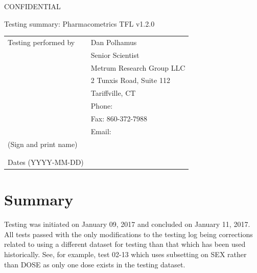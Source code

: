 \documentclass{article}
\newcommand{\topic}{Testing summary: Pharmacometrics TFL v1.2.0}
\begin{document}
\vspace*{1cm}
\begin{center}
{\large CONFIDENTIAL}


\vspace*{1cm}


\vspace*{1cm}

{\Large \topic}
\vspace{3.0cm}
\end{center}

\newpage
\vspace*{1cm}
\begin{center}
\vspace{3.0cm}

\begin{tabular}{|l|l|}\hline
Testing performed by &   Dan Polhamus\\
                      &  Senior Scientist \\
                      &  Metrum Research Group LLC \\
                      &  2 Tunxis Road, Suite 112\\
                      &  Tariffville, CT\\
                      &  Phone:  \\
                      &  Fax: 860-372-7988 \\
                      &  Email:  \\\hline
 (Sign and print name) & \\
                       & \\
                       & \\\hline
Dates (YYYY-MM-DD)     &               \\\hline



\end{tabular}

\end{center}

\newpage

\tableofcontents
\listoffigures

\newpage

\section*{Summary}

Testing was initiated on January 09, 2017 and concluded on January 11, 2017.  All 
tests passed with the only modifications to the testing log being corrections related 
to using a different dataset for testing than that which has been used historically.  
See, for example, test 02-13 which uses subsetting on SEX rather than DOSE as only
one dose exists in the testing dataset.
\end{document}
